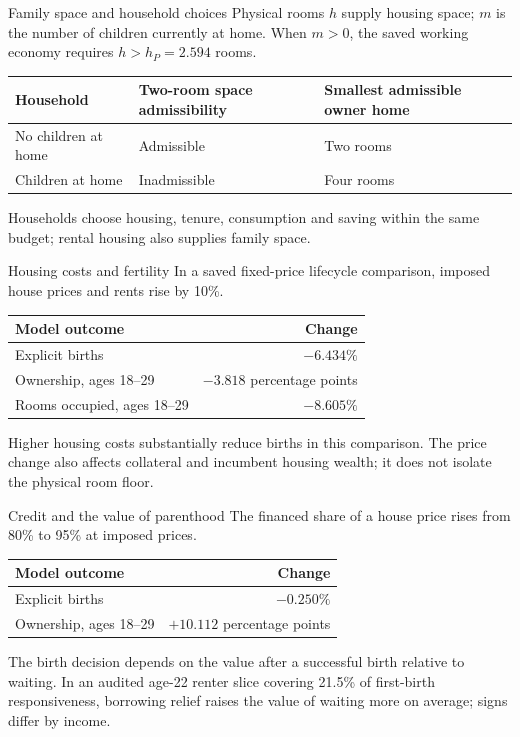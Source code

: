 \documentclass[11pt,aspectratio=169]{beamer}
\begin{document}
\begin{frame}{Family space and household choices}
\small
Physical rooms $h$ supply housing space; $m$ is the number of children currently at home.
When $m>0$, the saved working economy requires $h>h_P=2.594$ rooms.
\par\medskip
\begin{center}
\begin{tabular}{lll}
\toprule
Household & Two-room space admissibility & Smallest admissible owner home\\
\midrule
No children at home & Admissible & Two rooms\\
Children at home & Inadmissible & Four rooms\\
\bottomrule
\end{tabular}
\end{center}
\par\medskip
Households choose housing, tenure, consumption and saving within the same budget; rental housing also supplies family space.
\end{frame}

\begin{frame}{Housing costs and fertility}
\small
In a saved fixed-price lifecycle comparison, imposed house prices and rents rise by 10\%.
\par\medskip
\begin{center}
\begin{tabular}{lr}
\toprule
Model outcome & Change\\
\midrule
Explicit births & $-6.434\%$\\
Ownership, ages 18--29 & $-3.818$ percentage points\\
Rooms occupied, ages 18--29 & $-8.605\%$\\
\bottomrule
\end{tabular}
\end{center}
\par\medskip
Higher housing costs substantially reduce births in this comparison. The price change also affects collateral and incumbent housing wealth; it does not isolate the physical room floor.
\end{frame}

\begin{frame}{Credit and the value of parenthood}
\small
The financed share of a house price rises from 80\% to 95\% at imposed prices.
\par\medskip
\begin{center}
\begin{tabular}{lr}
\toprule
Model outcome & Change\\
\midrule
Explicit births & $-0.250\%$\\
Ownership, ages 18--29 & $+10.112$ percentage points\\
\bottomrule
\end{tabular}
\end{center}
\par\medskip
The birth decision depends on the value after a successful birth relative to waiting. In an audited age-22 renter slice covering 21.5\% of first-birth responsiveness, borrowing relief raises the value of waiting more on average; signs differ by income.
\end{frame}
\end{document}
